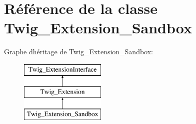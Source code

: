 \hypertarget{class_twig___extension___sandbox}{}\section{Référence de la classe Twig\+\_\+\+Extension\+\_\+\+Sandbox}
\label{class_twig___extension___sandbox}
Graphe d\textquotesingle{}héritage de Twig\+\_\+\+Extension\+\_\+\+Sandbox\+:\begin{figure}[H]
\begin{center}
\leavevmode
\includegraphics[height=3.000000cm]{class_twig___extension___sandbox}
\end{center}
\end{figure}
